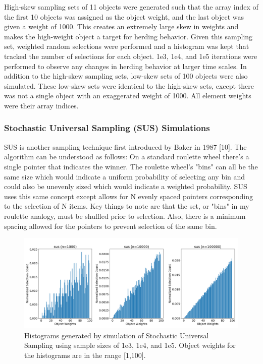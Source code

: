 \documentclass[12pt]{article}
\begin{document}
    High-skew sampling sets of 11 objects were generated such that the array
    index of the first 10 objects was assigned as the object weight, and the
    last object was given a weight of 1000. This creates an extremely large
    skew in weights and makes the high-weight object a target for herding
    behavior. Given this sampling set, weighted random selections were
    performed and a histogram was kept that tracked the number of selections
    for each object. 1e3, 1e4, and 1e5 iterations were performed to observe any
    changes in herding behavior at larger time scales. In addition to the
    high-skew sampling sets, low-skew sets of 100 objects were also simulated.
    These low-skew sets were identical to the high-skew sets, except there was
    not a single object with an exaggerated weight of 1000. All element weights
    were their array indices.

    \subsubsection{Stochastic Universal Sampling (SUS) Simulations}
    SUS is another sampling technique first introduced by Baker in 1987 [10].
    The algorithm can be understood as follows: On a standard roulette wheel
    there's a single pointer that indicates the winner. The roulette wheel's
    "bins" can all be the same size which would indicate a uniform probability
    of selecting any bin and could also be unevenly sized which would indicate
    a weighted probability. SUS uses this same concept except allows for N
    evenly spaced pointers corresponding to the selection of N items. Key
    things to note are that the set, or "bins" in my roulette analogy, must be
    shuffled prior to selection. Also, there is a minimum spacing allowed for
    the pointers to prevent selection of the same bin.

    \begin{figure}[h]
      \centering
      \includegraphics[scale=0.30]{images/herding_roullette.png} 
      \caption{Histograms generated by simulation of Stochastic Universal
               Sampling using sample sizes of 1e3, 1e4, and 1e5. Object weights
               for the histograms are in the range [1,100].}
      \label{fig:herding_roullette}
    \end{figure}
\end{document}
